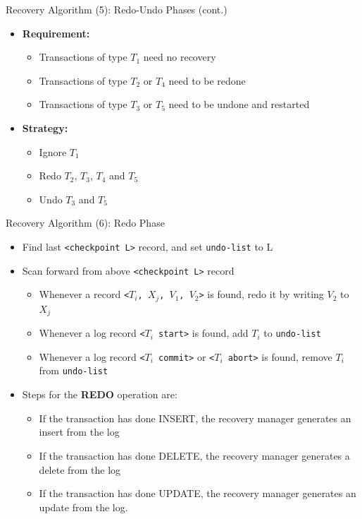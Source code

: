 \documentclass[aspectratio=169, xcolor=dvipsnames]{beamer}
\begin{document}
\begin{frame}{Recovery Algorithm (5): Redo-Undo Phases (cont.)}
    \begin{itemize}[<+->]
        \item \textbf{Requirement:}
        \begin{itemize}
            \item[$\triangleright$] Transactions of type $T_1$ need no recovery
            \item[$\triangleright$] Transactions of type $T_2$ or $T_4$ need to be redone
            \item[$\triangleright$] Transactions of type $T_3$ or $T_5$ need to be undone and restarted
        \end{itemize}
        \item \textbf{Strategy:}
        \begin{itemize}
            \item[$\triangleright$] Ignore $T_1$
            \item[$\triangleright$] Redo $T_2$, $T_3$, $T_4$ and $T_5$
            \item[$\triangleright$] Undo $T_3$ and $T_5$
        \end{itemize}
    \end{itemize}
\end{frame}

\begin{frame}{Recovery Algorithm (6): Redo Phase}
    \begin{itemize}[<+->]
        \item Find last \texttt{<checkpoint L>} record, and set \texttt{undo-list} to L
        \item Scan forward from above \texttt{<checkpoint L>} record
        \begin{itemize}
            \item[$\triangleright$] Whenever a record \texttt{<$T_i$, $X_j$, $V_1$, $V_2$>} is found, redo it by writing $V_2$ to $X_j$
            \item[$\triangleright$] Whenever a log record \texttt{<$T_i$ start>} is found, add $T_i$ to \texttt{undo-list}
            \item[$\triangleright$] Whenever a log record \texttt{<$T_i$ commit>} or \texttt{<$T_i$ abort>} is found, remove $T_i$ from \texttt{undo-list}
        \end{itemize}
        \item Steps for the \textbf{REDO} operation are:
        \begin{itemize}
            \item[$\triangleright$] If the transaction has done INSERT, the recovery manager generates an insert from the log
            \item[$\triangleright$] If the transaction has done DELETE, the recovery manager generates a delete from the log
            \item[$\triangleright$] If the transaction has done UPDATE, the recovery manager generates an update from the log.
        \end{itemize}
    \end{itemize}
\end{frame}
\end{document}
